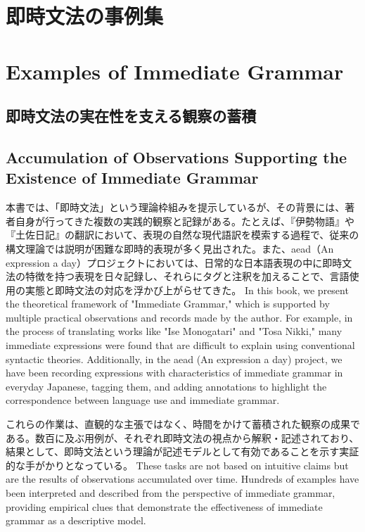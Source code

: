 \ifJPN
\section{即時文法の事例集}
\else
\section{Examples of Immediate Grammar}
\fi
\label{sec:immediate_grammar_examples}

\ifJPN
\subsection{即時文法の実在性を支える観察の蓄積}
\else
\subsection{Accumulation of Observations Supporting the Existence of Immediate Grammar} 
\fi
\label{subsec:immediate_grammar_observations}

\ifJPN
本書では、「即時文法」という理論枠組みを提示しているが、その背景には、著者自身が行ってきた複数の実践的観察と記録がある。たとえば、『伊勢物語』や『土佐日記』の翻訳において、表現の自然な現代語訳を模索する過程で、従来の構文理論では説明が困難な即時的表現が多く見出された。また、aead（An expression a day）プロジェクトにおいては、日常的な日本語表現の中に即時文法の特徴を持つ表現を日々記録し、それらにタグと注釈を加えることで、言語使用の実態と即時文法の対応を浮かび上がらせてきた。
\else
In this book, we present the theoretical framework of "Immediate Grammar," which is supported by multiple practical observations and records made by the author. For example, in the process of translating works like "Ise Monogatari" and "Tosa Nikki," many immediate expressions were found that are difficult to explain using conventional syntactic theories. Additionally, in the aead (An expression a day) project, we have been recording expressions with characteristics of immediate grammar in everyday Japanese, tagging them, and adding annotations to highlight the correspondence between language use and immediate grammar.
\fi

\ifJPN
これらの作業は、直観的な主張ではなく、時間をかけて蓄積された観察の成果である。数百に及ぶ用例が、それぞれ即時文法の視点から解釈・記述されており、結果として、即時文法という理論が記述モデルとして有効であることを示す実証的な手がかりとなっている。
\else
These tasks are not based on intuitive claims but are the results of observations accumulated over time. Hundreds of examples have been interpreted and described from the perspective of immediate grammar, providing empirical clues that demonstrate the effectiveness of immediate grammar as a descriptive model.
\fi



